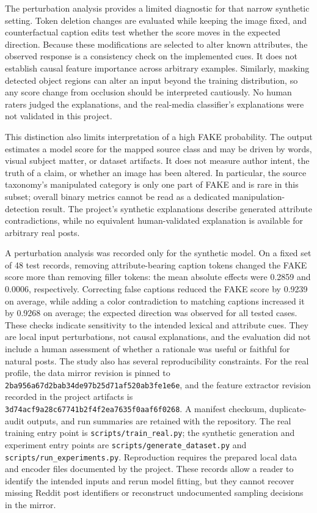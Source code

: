 \documentclass[conference]{IEEEtran}
\begin{document}
The perturbation analysis provides a limited diagnostic for that narrow synthetic setting. Token deletion changes are evaluated while keeping the image fixed, and counterfactual caption edits test whether the score moves in the expected direction. Because these modifications are selected to alter known attributes, the observed response is a consistency check on the implemented cues. It does not establish causal feature importance across arbitrary examples. Similarly, masking detected object regions can alter an input beyond the training distribution, so any score change from occlusion should be interpreted cautiously. No human raters judged the explanations, and the real-media classifier's explanations were not validated in this project.

This distinction also limits interpretation of a high FAKE probability. The output estimates a model score for the mapped source class and may be driven by words, visual subject matter, or dataset artifacts. It does not measure author intent, the truth of a claim, or whether an image has been altered. In particular, the source taxonomy's manipulated category is only one part of FAKE and is rare in this subset; overall binary metrics cannot be read as a dedicated manipulation-detection result. The project's synthetic explanations describe generated attribute contradictions, while no equivalent human-validated explanation is available for arbitrary real posts.

A perturbation analysis was recorded only for the synthetic model. On a fixed set of 48 test records, removing attribute-bearing caption tokens changed the FAKE score more than removing filler tokens: the mean absolute effects were 0.2859 and 0.0006, respectively. Correcting false captions reduced the FAKE score by 0.9239 on average, while adding a color contradiction to matching captions increased it by 0.9268 on average; the expected direction was observed for all tested cases. These checks indicate sensitivity to the intended lexical and attribute cues. They are local input perturbations, not causal explanations, and the evaluation did not include a human assessment of whether a rationale was useful or faithful for natural posts.
The study also has several reproducibility constraints. For the real profile, the data mirror revision is pinned to \texttt{2ba956a67d2bab34de97b25d71af520ab3fe1e6e}, and the feature extractor revision recorded in the project artifacts is \texttt{3d74acf9a28c67741b2f4f2ea7635f0aaf6f0268}. A manifest checksum, duplicate-audit outputs, and run summaries are retained with the repository. The real training entry point is \texttt{scripts/train\_real.py}; the synthetic generation and experiment entry points are \texttt{scripts/generate\_dataset.py} and \texttt{scripts/run\_experiments.py}. Reproduction requires the prepared local data and encoder files documented by the project. These records allow a reader to identify the intended inputs and rerun model fitting, but they cannot recover missing Reddit post identifiers or reconstruct undocumented sampling decisions in the mirror.
\end{document}
